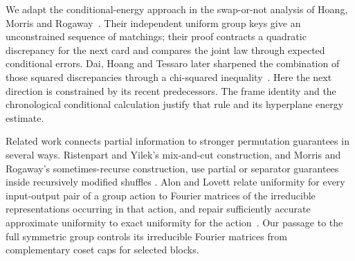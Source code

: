We adapt the conditional-energy approach in the swap-or-not analysis
of Hoang, Morris and Rogaway~\cite[Section~3, Theorem~3 and Lemma~4]{hmr2014}.
Their independent uniform group keys give an unconstrained sequence of
matchings; their proof contracts a quadratic discrepancy for the next card
and compares the joint law through expected conditional errors. Dai,
Hoang and Tessaro later sharpened the combination of those squared
discrepancies through a chi-squared inequality~\cite[Section~6]{dai-hoang-tessaro2017}.
Here the next direction is constrained by its recent predecessors.
The frame identity and the chronological conditional calculation
justify that rule and its hyperplane energy estimate.

Related work connects partial information to stronger permutation
guarantees in several ways. Ristenpart and Yilek's mix-and-cut construction,
and Morris and Rogaway's sometimes-recurse construction, use partial
or separator guarantees inside recursively modified shuffles
\cite{ristenpart-yilek2013,morris-rogaway2014}. Alon and Lovett relate
uniformity for every input-output pair of a group action to Fourier
matrices of the irreducible representations occurring in that action,
and repair sufficiently accurate approximate uniformity to exact
uniformity for the action~\cite[Theorem~1.4 and Proposition~3.2]{alon-lovett2013}.
Our passage to the full symmetric group controls its irreducible Fourier
matrices from complementary coset caps for selected blocks.
